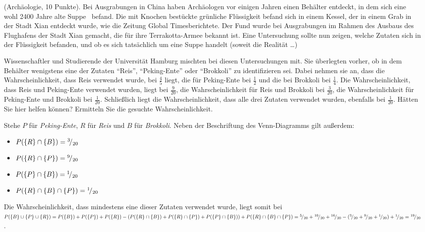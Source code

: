 \documentclass[twoside]{article}
\begin{document}
(Archäologie, 10 Punkte).
Bei Ausgrabungen in China haben Archäologen vor einigen Jahren einen Behälter entdeckt, in dem sich eine wohl 2400 Jahre alte \dq Suppe \dq ~befand.
Die mit Knochen bestückte grünliche Flüssigkeit befand sich in einem Kessel, der in einem Grab in der Stadt Xian entdeckt wurde, wie die Zeitung \dq Global Times\dq berichtete.
Der Fund wurde bei Ausgrabungen im Rahmen des Ausbaus des Flughafens der Stadt Xian gemacht, die für ihre Terrakotta-Armee bekannt ist.
Eine Untersuchung sollte nun zeigen, welche Zutaten sich in der Flüssigkeit befanden, und ob es sich tatsächlich um eine Suppe handelt (soweit die Realität \dots)


Wissenschaftler und Studierende der Universität Hamburg mischten bei diesen Untersuchungen mit.
Sie überlegten vorher, ob in dem Behälter wenigstens eine der Zutaten ``Reis'', ``Peking-Ente'' oder ``Brokkoli'' zu identifizieren sei.
Dabei nehmen sie an, dass die Wahrscheinlichkeit, dass Reis verwendet wurde, bei $\frac{4}{5}$ liegt, die für Peking-Ente bei $\frac{1}{2}$ und die bei Brokkoli bei $\frac{1}{4}$.
Die Wahrscheinlichkeit, dass Reis und Peking-Ente verwendet wurden, liegt bei $\frac{9}{20}$, die Wahrscheinlichkeit für Reis und Brokkoli bei $\frac{3}{20}$, die Wahrscheinlichkeit für Peking-Ente und Brokkoli bei $\frac{1}{20}$.
Schließlich liegt die Wahrscheinlichkeit, dass alle drei Zutaten verwendet wurden, ebenfalls bei $\frac{1}{20}$.
Hätten Sie hier helfen können?
Ermitteln Sie die gesuchte Wahrscheinlichkeit.
\begin{center}

\end{center}
Stehe $P$ für \textit{Peking-Ente}, $R$ für \textit{Reis} und $B$ für \textit{Brokkoli}.
Neben der Beschriftung des Venn-Diagramms gilt außerdem:
\begin{itemize}
	\item $P(\{R\} \cap \{B\}) = {}^{3}\!/_{20}$
	\item $P(\{R\} \cap \{P\}) = {}^{9}\!/_{20}$
	\item $P(\{P\} \cap \{B\}) = {}^{1}\!/_{20}$
	\item $P(\{R\} \cap \{B\} \cap \{P\}) = {}^{1}\!/_{20}$
\end{itemize}
Die Wahrscheinlichkeit, dass mindestens eine dieser Zutaten verwendet wurde, liegt somit bei
$P(\{B\} \cup \{P\} \cup \{R\}) = P(\{B\}) + P(\{P\}) + P(\{R\}) - (P(\{R\} \cap \{B\}) + P(\{R\} \cap \{P\}) + P(\{P\} \cap \{B\})) + P(\{R\} \cap \{B\} \cap \{P\}) = \ilfrac{5}{20} + \ilfrac{10}{20} + \ilfrac{16}{20} - (\ilfrac{3}{20} + \ilfrac{9}{20} + \ilfrac{1}{20}) + \ilfrac{1}{20} = \ilfrac{19}{20}$.
\end{document}
